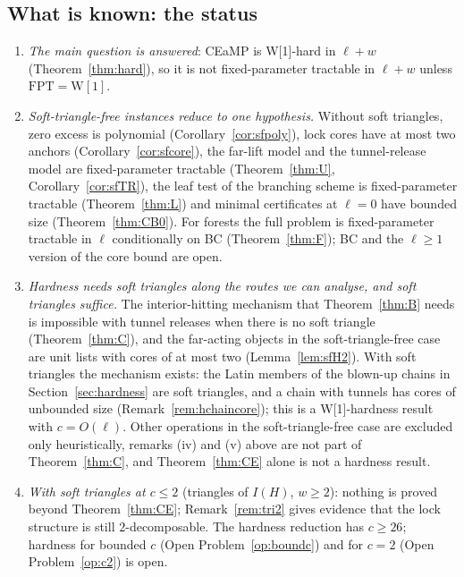 \subsection{What is known: the status}\label{sec:softstatus}
\begin{enumerate}
\item \emph{The main question is answered}: CEaMP is W[1]-hard in $\ell+w$ (Theorem~\ref{thm:hard}), so it is not fixed-parameter tractable in $\ell+w$ unless $\mathrm{FPT}=\mathrm{W[1]}$.
\item \emph{Soft-triangle-free instances reduce to one hypothesis.} Without soft triangles, zero excess is polynomial (Corollary~\ref{cor:sfpoly}), lock cores have at most two anchors (Corollary~\ref{cor:sfcore}), the far-lift model and the tunnel-release model are fixed-parameter tractable (Theorem~\ref{thm:U}, Corollary~\ref{cor:sfTR}), the leaf test of the branching scheme is fixed-parameter tractable (Theorem~\ref{thm:L}) and minimal certificates at $\ell=0$ have bounded size (Theorem~\ref{thm:CB0}). For forests the full problem is fixed-parameter tractable in $\ell$ conditionally on BC (Theorem~\ref{thm:F}); BC and the $\ell\ge1$ version of the core bound are open.
\item \emph{Hardness needs soft triangles along the routes we can analyse, and soft triangles suffice.} The interior-hitting mechanism that Theorem~\ref{thm:B} needs is impossible with tunnel releases when there is no soft triangle (Theorem~\ref{thm:C}), and the far-acting objects in the soft-triangle-free case are unit lists with cores of at most two (Lemma~\ref{lem:sfH2}). With soft triangles the mechanism exists: the Latin members of the blown-up chains in Section~\ref{sec:hardness} are soft triangles, and a chain with tunnels has cores of unbounded size (Remark~\ref{rem:hchaincore}); this is a W[1]-hardness result with $c=O(\ell)$. Other operations in the soft-triangle-free case are excluded only heuristically, remarks (iv) and (v) above are not part of Theorem~\ref{thm:C}, and Theorem~\ref{thm:CE} alone is not a hardness result.
\item \emph{With soft triangles at $c\le2$} (triangles of $I(H)$, $w\ge2$): nothing is proved beyond Theorem~\ref{thm:CE}; Remark~\ref{rem:tri2} gives evidence that the lock structure is still $2$-decomposable. The hardness reduction has $c\ge26$; hardness for bounded $c$ (Open Problem~\ref{op:boundc}) and for $c=2$ (Open Problem~\ref{op:c2}) is open.
\end{enumerate}
